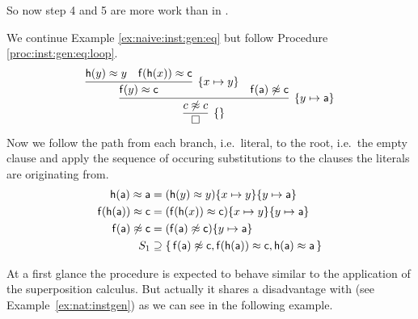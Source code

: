 So now step 4 and 5 are more work than in \InstGen.

\begin{example}
	We continue Example \vref{ex:naive:inst:gen:eq} but follow Procedure \vref{proc:inst:gen:eq:loop}.
	\begin{gather*}
		\infer[\mysub{y\mapsto \ma}]{
			\infer[\{\}]{\emptyclause}{c\mNE c}
			}{
		\infer[\mysub{x\mapsto y}]
		{\mf(y)\mEQ\mc}
		{\mh(y)\mEQ y & \mf(\mh(x))\mEQ \mc}
		& \mf(\ma)\mNE\mc
		}
	\end{gather*}
	Now we follow the path from each branch, i.e.~literal, to the root, i.e.~the empty clause
	and apply the sequence of occuring substitutions to the clauses the literals are originating from.
	\begin{align*}
		 \mathsf{h}(\mathsf{a})\approx \mathsf{a} &=
		 (\mathsf{h}(y)\approx y)\{ x\mapsto y \}\{ y\mapsto \mathsf{a} \}
		 \\
		 \mathsf{f}(\mathsf{h}(\mathsf{a}))\approx\mathsf{c} &=
		 (\mathsf{f}(\mathsf{h}(x))\approx \mathsf{c})\{ x\mapsto y \}\{ y\mapsto \mathsf{a} \}
		 \\
		 \mathsf{f}(\mathsf{a})\not\approx \mathsf{c} &=
		 (\mathsf{f}(\mathsf{a})\not\approx \mathsf{c})\{ y\mapsto \mathsf{a} \}
		 \\
		S_1 &\supseteq \{ \, 
			\mathsf{f}(\mathsf{a}) \not\approx \mathsf{c},
			\mathsf{f}(\mathsf{h}(\mathsf{a}))\approx \mathsf{c}, \mathsf{h}(\mathsf{a})\approx \mathsf{a}
		 \, \}
	\end{align*}


\end{example}



At a first glance the \InstGenEQ{} procedure is expected to behave similar to the application of the superposition calculus.
But actually it shares a disadvantage with \InstGen{} (see Example~\ref{ex:nat:instgen}) as we can see in the following example.


